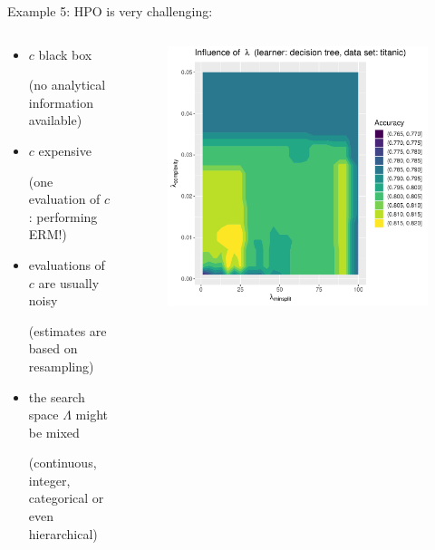 \begin{vbframe}{Example 5: HPO}
is very challenging:  
\vspace*{-0.2cm} 
\begin{columns}
	\begin{column}{0.6\textwidth}
	\begin{itemize}
		\item $c$ black box \\
		\begin{footnotesize}(no analytical information available)\end{footnotesize}
		\item $c$ expensive \\
		\begin{footnotesize}
		(one evaluation of $c$: performing ERM!)
		\end{footnotesize}
		\item evaluations of $c$ are usually noisy \\
		\begin{footnotesize}
		(estimates are based on resampling)
		\end{footnotesize}
  		\item the search space $\Lambda$ might be mixed 
		\begin{footnotesize}
		(continuous, integer, categorical or even hierarchical)
		\end{footnotesize}
	\end{itemize}
	\end{column}
	\begin{column}{0.39\textwidth}
		\begin{figure}[h]
			\centering
			\includegraphics[width = 1.0\textwidth]{figure_man/GE.pdf}
		\end{figure}
	\end{column}
\end{columns}
\end{vbframe}



